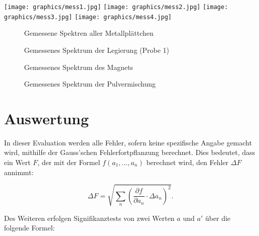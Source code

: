 \documentclass{article}
\begin{document}
\texttt{[image: graphics/mess1.jpg]}
\newpage
\texttt{[image: graphics/mess2.jpg]}
\newpage
\texttt{[image: graphics/mess3.jpg]}
\newpage
\texttt{[image: graphics/mess4.jpg]}
\newpage

\begin{figure}[!p]
    \centering
    \caption{Gemessene Spektren aller Metallplättchen}
    \label{fig:Metallplatten}
\end{figure}

\begin{figure}[!p]
    \centering
    \caption{Gemessenes Spektrum der Legierung (Probe 1)}
    \label{fig:Legierung}
\end{figure}

\begin{figure}[!p]
    \centering
    \caption{Gemessenes Spektrum des Magnets}
    \label{fig:Magnet}
\end{figure}

\begin{figure}[!p]
    \centering
    \caption{Gemessenes Spektrum der Pulvermischung}
    \label{fig:Pulvermischung}
\end{figure}

\clearpage
\newpage

\addtocounter{table}{2}

\section{Auswertung}

In dieser Evaluation werden alle Fehler, sofern keine spezifische Angabe gemacht wird, mithilfe der Gauss'schen Fehlerfortpflanzung berechnet. Dies bedeutet, dass ein Wert $F$, der mit der Formel $f(a_1, ..., a_n)$ berechnet wird, den Fehler $\Delta F$ annimmt:

\begin{equation}
    \Delta F = \sqrt{\sum_n \left( \frac{\partial f}{\partial a_n} \cdot \Delta a_n \right)^2}.
\end{equation}

Des Weiteren erfolgen Signifikanztests von zwei Werten $a$ und $a'$ über die folgende Formel:
\end{document}
